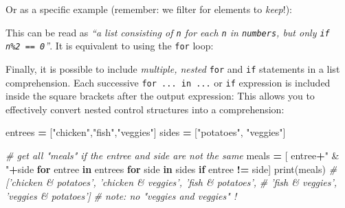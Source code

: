 \documentclass[]{book}
\newenvironment{Shaded}{\begin{snugshade}}{\end{snugshade}}
\newcommand{\KeywordTok}[1]{\textcolor[rgb]{0.13,0.29,0.53}{\textbf{#1}}}
\newcommand{\DecValTok}[1]{\textcolor[rgb]{0.00,0.00,0.81}{#1}}
\newcommand{\StringTok}[1]{\textcolor[rgb]{0.31,0.60,0.02}{#1}}
\newcommand{\CommentTok}[1]{\textcolor[rgb]{0.56,0.35,0.01}{\textit{#1}}}
\newcommand{\ControlFlowTok}[1]{\textcolor[rgb]{0.13,0.29,0.53}{\textbf{#1}}}
\newcommand{\OperatorTok}[1]{\textcolor[rgb]{0.81,0.36,0.00}{\textbf{#1}}}
\newcommand{\BuiltInTok}[1]{#1}
\newcommand{\NormalTok}[1]{#1}
\begin{document}
Or as a specific example (remember: we filter for elements to
\emph{keep}!):

\begin{Shaded}
\end{Shaded}

This can be read as \emph{``a list consisting of \texttt{n} for each
\texttt{n} in \texttt{numbers}, but only \texttt{if}
\texttt{n\%2\ ==\ 0}''}. It is equivalent to using the \texttt{for}
loop:

\begin{Shaded}
\end{Shaded}

Finally, it is possible to include \emph{multiple, nested} \texttt{for}
and \texttt{if} statements in a list comprehension. Each successive
\texttt{for\ ...\ in\ ...} or \texttt{if} expression is included inside
the square brackets after the output expression: This allows you to
effectively convert nested control structures into a comprehension:

\begin{Shaded}
\begin{Highlighting}[]
\NormalTok{entrees }\OperatorTok{=}\NormalTok{ [}\StringTok{"chicken"}\NormalTok{,}\StringTok{"fish"}\NormalTok{,}\StringTok{"veggies"}\NormalTok{]}
\NormalTok{sides }\OperatorTok{=}\NormalTok{ [}\StringTok{"potatoes"}\NormalTok{, }\StringTok{"veggies"}\NormalTok{]}

\CommentTok{# get all "meals" if the entree and side are not the same}
\NormalTok{meals }\OperatorTok{=}\NormalTok{ [ entree}\OperatorTok{+}\StringTok{" & "}\OperatorTok{+}\NormalTok{side }\ControlFlowTok{for}\NormalTok{ entree }\KeywordTok{in}\NormalTok{ entrees }\ControlFlowTok{for}\NormalTok{ side }\KeywordTok{in}\NormalTok{ sides }\ControlFlowTok{if}\NormalTok{ entree }\OperatorTok{!=}\NormalTok{ side]}
\BuiltInTok{print}\NormalTok{(meals)  }\CommentTok{# ['chicken & potatoes', 'chicken & veggies', 'fish & potatoes',}
              \CommentTok{#  'fish & veggies', 'veggies & potatoes']}
              \CommentTok{# note: no "veggies and veggies" !}
\end{Highlighting}
\end{Shaded}
\end{document}
